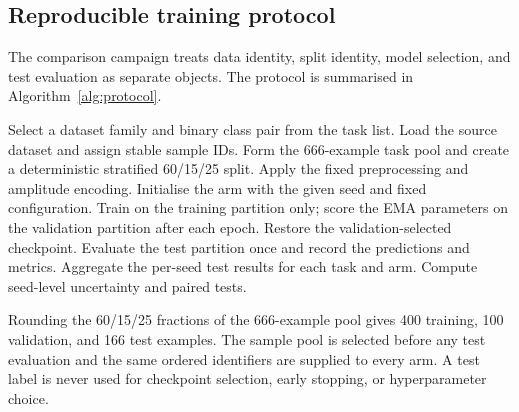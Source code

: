 \documentclass[conference]{IEEEtran}
\begin{document}
\subsection{Reproducible training protocol}
The comparison campaign treats data identity, split identity, model selection,
and test evaluation as separate objects. The protocol is summarised in
Algorithm~\ref{alg:protocol}.

\begin{algorithm}[!t]
\caption{Training and evaluation protocol}
\label{alg:protocol}
\begin{algorithmic}[1]
\STATE Select a dataset family and binary class pair from the task list.
\STATE Load the source dataset and assign stable sample IDs.
\STATE Form the 666-example task pool and create a deterministic stratified 60/15/25 split.
\STATE Apply the fixed preprocessing and amplitude encoding.
  \STATE Initialise the arm with the given seed and fixed configuration.
  \STATE Train on the training partition only; score the EMA parameters on the validation partition after each epoch.
  \STATE Restore the validation-selected checkpoint.
  \STATE Evaluate the test partition once and record the predictions and metrics.
\ENDFOR
\STATE Aggregate the per-seed test results for each task and arm.
\STATE Compute seed-level uncertainty and paired tests.
\end{algorithmic}
\end{algorithm}

Rounding the 60/15/25 fractions of the 666-example pool gives 400 training,
100 validation, and 166 test examples. The sample pool is selected before any
test evaluation and the same ordered identifiers are supplied to every arm. A
test label is never used for checkpoint selection, early stopping, or
hyperparameter choice.
\end{document}
